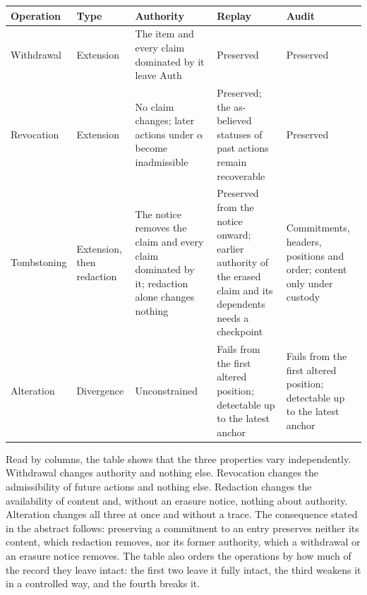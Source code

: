\documentclass[11pt]{article}
\theoremstyle{plain}
\theoremstyle{definition}
\theoremstyle{remark}
\begin{document}
\begin{center}
\small
\begin{tabular}{|p{}|p{}|p{}|p{}|p{}|}
\hline
Operation & Type & Authority & Replay & Audit \\
\hline
Withdrawal & Extension & The item and every claim dominated by it leave $\mathrm{Auth}$ & Preserved & Preserved \\
\hline
Revocation & Extension & No claim changes; later actions under $\alpha$ become inadmissible & Preserved; the as-believed statuses of past actions remain recoverable & Preserved \\
\hline
Tombstoning & Extension, then redaction & The notice removes the claim and every claim dominated by it; redaction alone changes nothing & Preserved from the notice onward; earlier authority of the erased claim and its dependents needs a checkpoint & Commitments, headers, positions and order; content only under custody \\
\hline
Alteration & Divergence & Unconstrained & Fails from the first altered position; detectable up to the latest anchor & Fails from the first altered position; detectable up to the latest anchor \\
\hline
\end{tabular}
\end{center}

Read by columns, the table shows that the three properties vary independently. Withdrawal changes authority and nothing else. Revocation changes the admissibility of future actions and nothing else. Redaction changes the availability of content and, without an erasure notice, nothing about authority. Alteration changes all three at once and without a trace. The consequence stated in the abstract follows: preserving a commitment to an entry preserves neither its content, which redaction removes, nor its former authority, which a withdrawal or an erasure notice removes. The table also orders the operations by how much of the record they leave intact: the first two leave it fully intact, the third weakens it in a controlled way, and the fourth breaks it.
\end{document}

